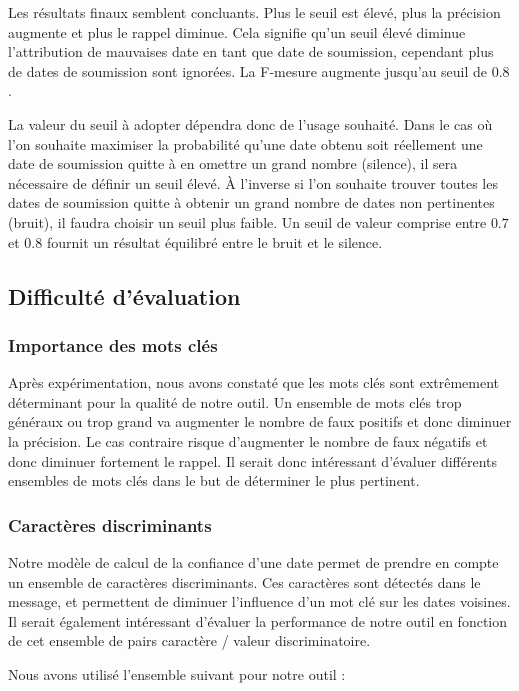 \documentclass[a4paper,french,10pt]{article}
\begin{document}
Les résultats finaux semblent concluants. Plus le seuil est élevé, plus la précision augmente et plus le rappel diminue. Cela signifie qu'un seuil élevé diminue l'attribution de mauvaises date en tant que date de soumission, cependant plus de dates de soumission sont ignorées. La F-mesure augmente jusqu'au seuil de $0.8$.

La valeur du seuil à adopter dépendra donc de l'usage souhaité. Dans le cas où l'on souhaite maximiser la probabilité qu'une date obtenu soit réellement une date de soumission quitte à en omettre un grand nombre (silence), il sera nécessaire de définir un seuil élevé. À l'inverse si l'on souhaite trouver toutes les dates de soumission quitte à obtenir un grand nombre de dates non pertinentes (bruit), il faudra choisir un seuil plus faible. Un seuil de valeur comprise entre $0.7$ et $0.8$ fournit un résultat équilibré entre le bruit et le silence.

\subsection{Difficulté d'évaluation}

\subsubsection{Importance des mots clés}
Après expérimentation, nous avons constaté que les mots clés sont extrêmement déterminant pour la qualité de notre outil. Un ensemble de mots clés trop généraux ou trop grand va augmenter le nombre de faux positifs et donc diminuer la précision. Le cas contraire risque d'augmenter le nombre de faux négatifs et donc diminuer fortement le rappel. Il serait donc intéressant d'évaluer différents ensembles de mots clés dans le but de déterminer le plus pertinent.

\subsubsection{Caractères discriminants}
Notre modèle de calcul de la confiance d'une date permet de prendre en compte un ensemble de caractères discriminants. Ces caractères sont détectés dans le message, et permettent de diminuer l'influence d'un mot clé sur les dates voisines. Il serait également intéressant d'évaluer la performance de notre outil en fonction de cet ensemble de pairs caractère / valeur discriminatoire.

Nous avons utilisé l'ensemble suivant pour notre outil :
\end{document}
